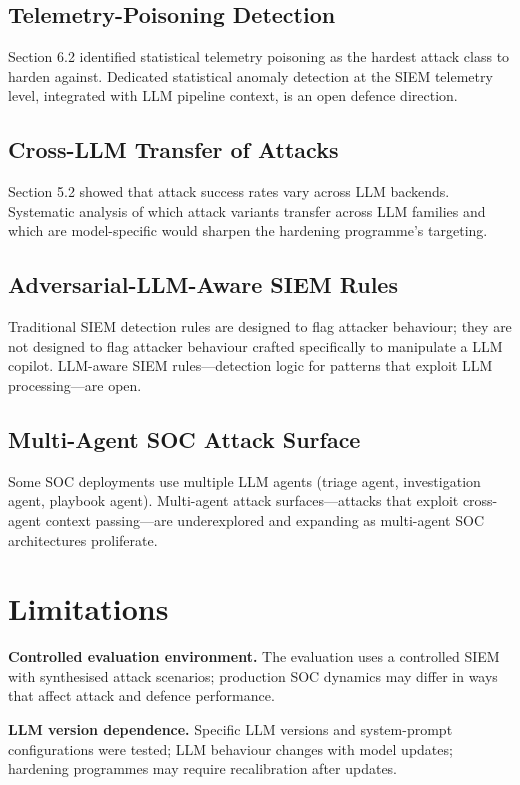 \documentclass[sigconf,nonacm]{acmart}
\begin{document}
\subsection{Telemetry-Poisoning Detection}

Section 6.2 identified statistical telemetry poisoning as the
hardest attack class to harden against. Dedicated statistical
anomaly detection at the SIEM telemetry level, integrated
with LLM pipeline context, is an open defence direction.

\subsection{Cross-LLM Transfer of Attacks}

Section 5.2 showed that attack success rates vary across LLM
backends. Systematic analysis of which attack variants transfer
across LLM families and which are model-specific would sharpen
the hardening programme's targeting.

\subsection{Adversarial-LLM-Aware SIEM Rules}

Traditional SIEM detection rules are designed to flag attacker
behaviour; they are not designed to flag attacker behaviour
crafted specifically to manipulate a LLM copilot. LLM-aware
SIEM rules---detection logic for patterns that exploit LLM
processing---are open.

\subsection{Multi-Agent SOC Attack Surface}

Some SOC deployments use multiple LLM agents (triage agent,
investigation agent, playbook agent). Multi-agent attack
surfaces---attacks that exploit cross-agent context passing---are
underexplored and expanding as multi-agent SOC architectures
proliferate.

\section{Limitations}

\textbf{Controlled evaluation environment.} The evaluation uses
a controlled SIEM with synthesised attack scenarios; production
SOC dynamics may differ in ways that affect attack and defence
performance.

\textbf{LLM version dependence.} Specific LLM versions and
system-prompt configurations were tested; LLM behaviour
changes with model updates; hardening programmes may require
recalibration after updates.
\end{document}
